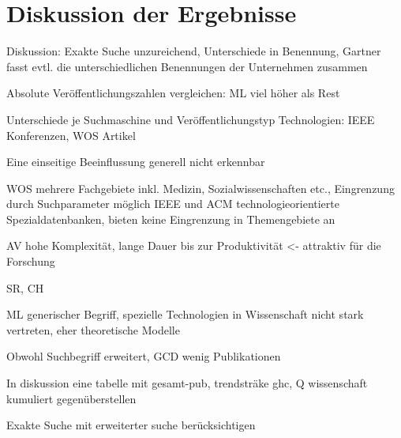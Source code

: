 \section{Diskussion der Ergebnisse}
Diskussion:
Exakte Suche unzureichend, Unterschiede in Benennung, Gartner fasst evtl. die unterschiedlichen Benennungen der Unternehmen zusammen

Absolute Veröffentlichungszahlen vergleichen: ML viel höher als Rest


Unterschiede je Suchmaschine und Veröffentlichungstyp
Technologien: IEEE Konferenzen, WOS Artikel

Eine einseitige Beeinflussung generell nicht erkennbar

WOS mehrere Fachgebiete inkl. Medizin, Sozialwissenschaften etc., Eingrenzung durch Suchparameter möglich
IEEE und ACM technologieorientierte Spezialdatenbanken, bieten keine Eingrenzung in Themengebiete an

AV hohe Komplexität, lange Dauer bis zur Produktivität <- attraktiv für die Forschung

SR, CH

ML generischer Begriff, spezielle Technologien in Wissenschaft nicht stark vertreten, eher theoretische Modelle

Obwohl Suchbegriff erweitert, GCD wenig Publikationen

In diskussion eine tabelle mit gesamt-pub, trendsträke ghc, Q wissenschaft kumuliert gegenüberstellen

Exakte Suche mit erweiterter suche berücksichtigen